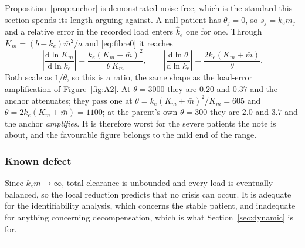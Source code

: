 \begin{remark}
\label{rem:anchor_var}
Proposition~\ref{prop:anchor} is demonstrated noise-free, which is the standard this section
spends its length arguing against. A null patient has $\theta_j = 0$, so $s_j = k_e m_j$ and
a relative error in the recorded load enters $\hat k_e$ one for one. Through
$K_m = (b - k_e)\bar m^2/a$ and \eqref{eq:fibre0} it reaches
\begin{equation}
\left|\frac{\mathrm{d}\ln K_m}{\mathrm{d}\ln k_e}\right|
= \frac{k_e (K_m + \bar m)^2}{\theta\,K_m},
\qquad
\left|\frac{\mathrm{d}\ln \theta}{\mathrm{d}\ln k_e}\right|
= \frac{2 k_e (K_m + \bar m)}{\theta}.
\label{eq:anchorfac}
\end{equation}
Both scale as $1/\theta$, so this is a ratio, the same shape as the
load-error amplification of Figure~\ref{fig:A2}. At $\theta = 3000$ they are $0.20$ and
$0.37$ and the anchor attenuates; they pass one at $\theta = k_e(K_m+\bar m)^2/K_m = 605$
and $\theta = 2k_e(K_m+\bar m) = 1100$; at the parent's own $\theta = 300$ they are $2.0$ and
$3.7$ and the anchor \emph{amplifies}. It is therefore worst for the severe patients the
note is about, and the favourable figure belongs to the mild end of the range.
\end{remark}

\subsubsection{Known defect}

Since $k_e m \to \infty$, total clearance is unbounded and every load is eventually balanced,
so the local reduction predicts that no crisis can occur. It is adequate for the
identifiability analysis, which concerns the stable patient, and inadequate for anything
concerning decompensation, which is what Section~\ref{sec:dynamic} is for.

\vspace{0.5em}
\hrule
\vspace{1em}


